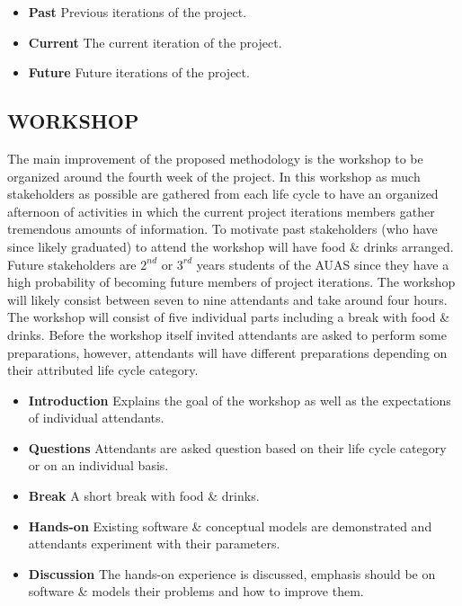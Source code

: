 \documentclass[conference]{IEEEtran}
\begin{document}
\begin{itemize}
	\item \textbf{Past} Previous iterations of the project.
	\item \textbf{Current} The current iteration of the project.
	\item \textbf{Future} Future iterations of the project.
\end{itemize}

\subsection{WORKSHOP}

The main improvement of the proposed methodology is the workshop to be organized around the fourth week of the project. In this workshop as much stakeholders as possible are gathered from each life cycle to have an organized afternoon of activities in which the current project iterations members gather tremendous amounts of information. To motivate past stakeholders (who have since likely graduated) to attend the workshop will have food \& drinks arranged. Future stakeholders are $2^{nd}$ or $3^{rd}$ years students of the AUAS since they have a high probability of becoming future members of project iterations. The workshop will likely consist between seven to nine attendants and take around four hours. The workshop will consist of five individual parts including a break with food \& drinks. Before the workshop itself invited attendants are asked to perform some preparations, however, attendants will have different preparations depending on their attributed life cycle category.

\begin{itemize}
	\item \textbf{Introduction} Explains the goal of the workshop as well as the expectations of individual attendants.
	\item \textbf{Questions} Attendants are asked question based on their life cycle category or on an individual basis.
	\item \textbf{Break} A short break with food \& drinks. 
	\item \textbf{Hands-on} Existing software \& conceptual models are demonstrated and attendants experiment with their parameters. 
	\item \textbf{Discussion} The hands-on experience is discussed, emphasis should be on software \& models their problems and how to improve them. 
\end{itemize}
\end{document}
